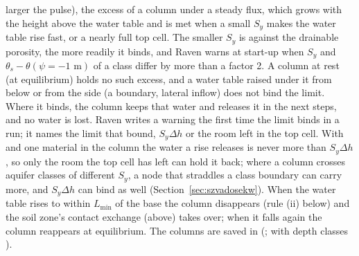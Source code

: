 larger the pulse), the excess of a column under a steady flux, which grows with the height above the water table and
is met when a small $S_y$ makes the water table rise fast, or a nearly full top cell. The smaller $S_y$ is against the
drainable porosity, the more readily it binds, and Raven warns at start-up when $S_y$ and
$\theta_s-\theta(\psi=-1\text{ m})$ of a class differ by more than a factor 2. A column at rest (at equilibrium) holds
no such excess, and a water table raised under it from below or from the side (a boundary, lateral inflow) does not
bind the limit. Where it binds, the column keeps that water and
releases it in the next steps, and no water is lost. Raven writes a warning the first time the limit binds in a run; it
names the limit that bound, $S_y\Delta h$ or the room left in the top cell.
With  and one material in the column the water a rise releases is never more than $S_y\Delta h$, so only
the room the top cell has left can hold it back; where a column crosses aquifer classes of different $S_y$, a node that
straddles a class boundary can carry more, and $S_y\Delta h$ can bind as well (Section~\ref{sec:szvadosekw}).
When the water table rises to within $L_{\min}$ of the base the column disappears (rule (ii) below) and the
soil zone's contact exchange (above) takes over; when it falls again the column reappears at equilibrium. The columns
are saved in  (; with depth classes ).

